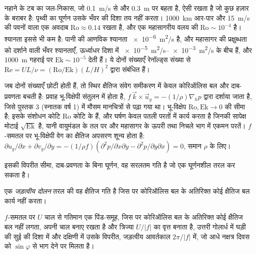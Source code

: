 नहाने के टब का जल-निकास, जो \qty{0.1}{m/s} से और \qty{0.3}{m} पर बहता है, ऐसी
 रखता है जो कुछ हज़ार के बराबर है: पृथ्वी का घूर्णन उसके भँवर की दिशा तय नहीं करता।
\qty{1000}{km} आर-पार और \qty{15}{m/s} की पवनों वाला एक अवदाब
$\mathrm{Ro} \approx 0.14$ रखता है, और एक महासागरीय वलय की $\mathrm{Ro} \sim 10^{-4}$ है।
श्यानता इससे भी कम है: पानी की आणविक श्यानता
\qty{e-6}{m^2/s} है, और महासागर की प्रक्षुब्धता को दर्शाने वाली भँवर श्यानताएँ,
ऊर्ध्वाधर दिशा में \qtyrange{e-5}{e-3}{m^2/s} के बीच हैं, और \qty{1000}{m} गहराई पर
$\mathrm{Ek} \sim 10^{-5}$ देती हैं। ये दोनों संख्याएँ
रेनॉल्ड्स संख्या से $\mathrm{Re} = UL/\nu =
(\mathrm{Ro}/\mathrm{Ek})(L/H)^2$ द्वारा संबंधित हैं।

जब दोनों संख्याएँ छोटी होती हैं, तो स्थिर क्षैतिज संवेग समीकरण में केवल
कोरिऑलिस बल और दाब-प्रवणता बचती है: प्रवाह भू-विक्षेपी संतुलन में होता है,
$f\,\vec k\times\vec u_g = -(1/\rho)\nabla_h p$ द्वारा दर्शाया जाता है, जिसे
पुस्तक 3 (स्नातक वर्ष 1) में मौसम मानचित्रों से पढ़ा गया था। भू-विक्षेप
$\mathrm{Ro}, \mathrm{Ek}\to 0$ की सीमा है; इसके संशोधन कोटि
$\mathrm{Ro}$ कोटि के हैं, और घर्षण केवल पतली परतों में कार्य करता है जिनकी
सापेक्ष मोटाई $\sqrt{\mathrm{Ek}}$ है, यानी वायुमंडल के तल पर और
महासागर के ऊपरी तथा निचले भाग में एकमन परतें। $f$-समतल पर भू-विक्षेपी वेग का
क्षैतिज अपसरण शून्य होता है: $\partial u_g/\partial x + \partial
v_g/\partial y = -(1/\rho f)(\partial^2 p/\partial x\partial y -
\partial^2 p/\partial y\partial x) = 0$, समान $\rho$ के लिए।

इसकी विपरीत सीमा, दाब-प्रवणता के बिना घूर्णन, वह सरलतम गति है जो
एक घूर्णनशील तरल कर सकता है।

\begin{definition}[जड़त्वीय दोलन]\label{def:b3:gfd-foundations:inertial}
एक \emph{जड़त्वीय दोलन} तरल की वह क्षैतिज गति है
जिस पर कोरिऑलिस बल के अतिरिक्त कोई क्षैतिज बल
कार्य नहीं करता।
\end{definition}

\begin{theorem}[जड़त्वीय वृत्त]\label{thm:b3:gfd-foundations:inertial}
$f$-समतल पर $U$ चाल से गतिमान एक पिंड-समूह, जिस पर कोरिऑलिस बल के अतिरिक्त कोई क्षैतिज बल नहीं लगता,
अपनी चाल बनाए रखता है और त्रिज्या
$U/|f|$ का वृत्त बनाता है, उत्तरी गोलार्ध में घड़ी की सुई की दिशा में और दक्षिणी में उसके विपरीत,
जड़त्वीय आवर्तकाल $2\pi/|f|$ में, जो आधे नक्षत्र दिवस
को $\sin\varphi$ से भाग देने पर मिलता है।
\end{theorem}

